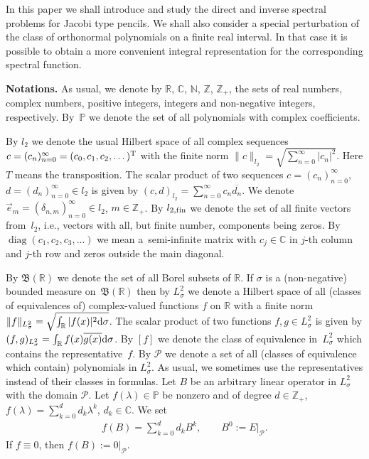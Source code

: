 \documentclass[pdftex]{sigma}
\numberwithin{equation}{section}
\begin{document}
In this paper we shall introduce and study the direct and inverse spectral problems for Jacobi type pencils. We shall also consider a special perturbation of the class of orthonormal polynomials on a f\/inite real interval. In that case it is possible to obtain a more convenient integral representation for the corresponding spectral function.

{\bf Notations.} As usual, we denote by $\mathbb{R}$, $\mathbb{C}$, $\mathbb{N}$, $\mathbb{Z}$, $\mathbb{Z}_+$, the sets of real numbers, complex numbers, positive integers, integers and non-negative integers, respectively. By~$\mathbb{P}$ we denote the set of all polynomials with complex coef\/f\/icients.

By $l_2$ we denote the usual Hilbert space of all complex sequences $c = (c_n)_{n=0}^\infty = (c_0,c_1,c_2,\dots)^{\rm T}$ with the f\/inite norm $\| c \|_{l_2} = \sqrt{\sum\limits_{n=0}^\infty |c_n|^2}$. Here $T$ means the transposition. The scalar product of two sequences $c = (c_n)_{n=0}^\infty$, $d = (d_n)_{n=0}^\infty\in l_2$ is given by $(c,d)_{l_2} = \sum\limits_{n=0}^\infty c_n \overline{d_n}$. We denote $\vec e_m = (\delta_{n,m})_{n=0}^\infty\in l_2$, $m\in\mathbb{Z}_+$. By $l_{2,{\rm f\/in}}$ we denote the set of all f\/inite vectors from~$l_2$, i.e., vectors with all, but f\/inite number, components being zeros. By $\operatorname{diag} (c_1,c_2,c_3,\dots)$ we mean a~semi-inf\/inite matrix with $c_j\in\mathbb{C}$ in $j$-th column and $j$-th row and zeros outside the main diagonal.

By $\mathfrak{B}(\mathbb{R})$ we denote the set of all Borel subsets of $\mathbb{R}$. If $\sigma$ is a (non-negative) bounded measure on~$\mathfrak{B}(\mathbb{R})$ then by $L^2_\sigma$ we denote a Hilbert space of all (classes of equivalences of) complex-valued functions $f$ on $\mathbb{R}$ with a f\/inite norm $\| f \|_{L^2_\sigma} = \sqrt{ \int_\mathbb{R} |f(x)|^2 {\rm d}\sigma }$. The scalar product of two functions $f,g\in L^2_\sigma$ is given by $(f,g)_{L^2_\sigma} = \int_{\mathbb{R}} f(x) \overline{g(x)} {\rm d}\sigma$. By $[ f ]$ we denote the class of equivalence in~$L^2_\sigma$ which contains the representative~$f$. By $\mathcal{P}$ we denote a set of all (classes of equivalence which contain) polynomials in $L^2_\sigma$. As usual, we sometimes use the representatives instead of their classes in formulas. Let $B$ be an arbitrary linear operator in $L^2_\sigma$ with the domain $\mathcal{P}$. Let $f(\lambda)\in\mathbb{P}$ be nonzero and of degree $d\in\mathbb{Z}_+$, $f(\lambda) = \sum\limits_{k=0}^d d_k \lambda^k$, $d_k\in\mathbb{C}$. We set
\begin{gather*} f(B) = \sum_{k=0}^d d_k B^k,\qquad B^0 := E|_{\mathcal{P}}. \end{gather*}
If $f\equiv 0$, then $f(B):= 0|_{\mathcal{P}}$.
\end{document}
